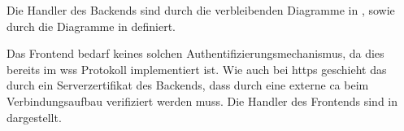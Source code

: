 Die Handler des Backends sind durch die verbleibenden Diagramme in , 
sowie durch die Diagramme in  definiert.


Das Frontend bedarf keines solchen Authentifizierungsmechanismus, da dies bereits im \ac{wss} Protokoll implementiert ist. 
Wie auch bei \ac{https} geschieht das durch ein Serverzertifikat des Backends, 
dass durch eine externe \ac{ca} beim Verbindungsaufbau verifiziert werden muss.
Die Handler des Frontends sind in  dargestellt.

